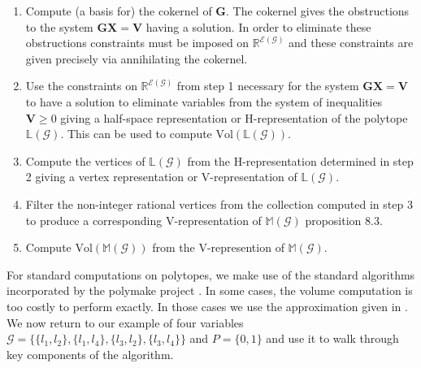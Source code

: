 \begin{enumerate}
\item Compute (a basis for) the cokernel of $\mathbf{G}$. The cokernel gives the obstructions to the system $\mathbf{G}\mathbf{X}=\mathbf{V}$ having a solution. In order to eliminate these obstructions constraints must be imposed on $\mathbb{R}^{\mathcal{E}(\mathcal{G})}$ and these constraints are given precisely via annihilating the cokernel.
\item Use the constraints on $\mathbb{R}^{\mathcal{E}(\mathcal{G})}$ from step 1 necessary for the system $\mathbf{G}\mathbf{X}=\mathbf{V}$ to have a solution to eliminate variables from the system of inequalities $\mathbf{V} \geq 0$ giving a half-space representation or H-representation of the polytope $\mathbb{L}(\mathcal{G})$. This can be used to compute $\text{Vol}(\mathbb{L}(\mathcal{G}))$.
\item Compute the vertices of $\mathbb{L}(\mathcal{G})$ from the H-representation determined in step 2 giving a vertex representation or V-representation of $\mathbb{L}(\mathcal{G})$.
\item Filter the non-integer rational vertices from the collection computed in step 3 to produce a corresponding V-representation of $\mathbb{M}(\mathcal{G})$ \cite{Wainwright2007} proposition 8.3.
\item Compute $\text{Vol}(\mathbb{M}(\mathcal{G}))$ from the V-represention of $\mathbb{M}(\mathcal{G})$.
\end{enumerate}

For standard computations on polytopes, we make use of the standard algorithms incorporated by the polymake project \cite{Gawrilow2000}. In some cases, the volume computation is too costly to perform exactly. In those cases we use the approximation given in \cite{Cousins}.  We now return to our example of four variables $\mathcal{G} = \{\{l_1,l_2 \},\{l_1,l_4 \},\{l_3,l_2\},\{l_3,l_4\} \}$ and $P=\{0,1\}$ and use it to walk through key components of the algorithm.

